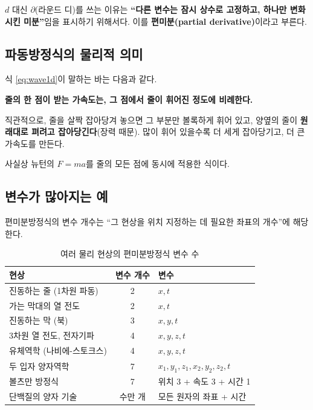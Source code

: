 \documentclass[11pt,a4paper]{article}
\begin{document}
$d$ 대신 $\partial$(라운드 디)를 쓰는 이유는 \textbf{``다른 변수는 잠시 상수로 고정하고, 하나만 변화시킨 미분''}임을 표시하기 위해서다. 이를 \textbf{편미분(partial derivative)}이라고 부른다.

\subsection{파동방정식의 물리적 의미}

식 \eqref{eq:wave1d}이 말하는 바는 다음과 같다.

\begin{quotebox}
\textbf{줄의 한 점이 받는 가속도는, 그 점에서 줄이 휘어진 정도에 비례한다.}
\end{quotebox}

직관적으로, 줄을 살짝 잡아당겨 놓으면 그 부분만 볼록하게 휘어 있고, 양옆의 줄이 \textbf{원래대로 펴려고 잡아당긴다}(장력 때문). 많이 휘어 있을수록 더 세게 잡아당기고, 더 큰 가속도를 만든다.

사실상 뉴턴의 $F = ma$를 줄의 모든 점에 동시에 적용한 식이다.

\subsection{변수가 많아지는 예}

편미분방정식의 변수 개수는 ``그 현상을 위치 지정하는 데 필요한 좌표의 개수''에 해당한다.

\begin{table}[h]
\centering
\small
\begin{tabular}{lcl}
\toprule
\textbf{현상} & \textbf{변수 개수} & \textbf{변수} \\
\midrule
진동하는 줄 (1차원 파동)      & 2  & $x, t$ \\
가는 막대의 열 전도         & 2  & $x, t$ \\
진동하는 막 (북)         & 3  & $x, y, t$ \\
3차원 열 전도, 전자기파      & 4  & $x, y, z, t$ \\
유체역학 (나비에-스토크스)     & 4  & $x, y, z, t$ \\
두 입자 양자역학         & 7  & $x_1,y_1,z_1, x_2,y_2,z_2, t$ \\
볼츠만 방정식           & 7  & 위치 3 + 속도 3 + 시간 1 \\
단백질의 양자 기술        & 수만 개 & 모든 원자의 좌표 + 시간 \\
\bottomrule
\end{tabular}
\caption{여러 물리 현상의 편미분방정식 변수 수}
\end{table}
\end{document}
